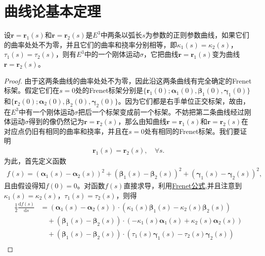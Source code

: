 \documentclass[../../main.tex]{subfiles}%
\begin{document}
\section{曲线论基本定理}

\begin{theorem}\label{theorem:两条曲率挠率相同的曲线只相差一个位置}
设$\bm{r} = \bm{r}_1(s)$和$\bm{r} = \bm{r}_2(s)$是$E^3$中两条以弧长$s$为参数的正则参数曲线，如果它们的曲率处处不为零，并且它们的曲率和挠率分别相等，即$\kappa_1(s) = \kappa_2(s)$，$\tau_1(s) = \tau_2(s)$，则有$E^3$中的一个刚体运动$\sigma$，它把曲线$\bm{r} = \bm{r}_1(s)$变为曲线$\bm{r} = \bm{r}_2(s)$。
\end{theorem}
\begin{proof}

由于这两条曲线的曲率处处不为零，因此沿这两条曲线有完全确定的Frenet标架。假定它们在$s=0$处的Frenet标架分别是$\{\bm{r}_1(0);\bm{\alpha}_1(0),\bm{\beta}_1(0),\bm{\gamma}_1(0)\}$和$\{\bm{r}_2(0);\bm{\alpha}_2(0),\bm{\beta}_2(0),\bm{\gamma}_2(0)\}$。因为它们都是右手单位正交标架，故由，在$E^3$中有一个刚体运动$\sigma$把后一个标架变成前一个标架。不妨把第二条曲线经过刚体运动$\sigma$得到的像仍然记为$\bm{r} = \bm{r}_2(s)$，那么由知曲线$\bm{r} = \bm{r}_1(s)$和$\bm{r} = \bm{r}_2(s)$在对应点仍旧有相同的曲率和挠率，并且在$s=0$处有相同的Frenet标架。我们要证明
\begin{align*}
\bm{r}_1(s) = \bm{r}_2(s),\quad \forall s.
\end{align*}
为此，首先定义函数
\begin{align}
f(s) = (\bm{\alpha}_1(s) - \bm{\alpha}_2(s))^2 + (\bm{\beta}_1(s) - \bm{\beta}_2(s))^2 + (\bm{\gamma}_1(s) - \bm{\gamma}_2(s))^2,
\label{eq:--3ur0jfdjgijiL:LIHFIOAWHFNASawf5.1}
\end{align}
且由假设得知$f(0) = 0$。对函数$f(s)$直接求导，利用\hyperref[theorem:微分几何-Frenet公式]{Frenet公式},并且注意到$\kappa_1(s) = \kappa_2(s)$，$\tau_1(s) = \tau_2(s)$，则得
\begin{align*}
\frac{1}{2}\frac{\mathrm{d}f(s)}{\mathrm{d}s} &= (\bm{\alpha}_1(s) - \bm{\alpha}_2(s)) \cdot (\kappa_1(s)\bm{\beta}_1(s) - \kappa_2(s)\bm{\beta}_2(s)) \\
&\quad + (\bm{\beta}_1(s) - \bm{\beta}_2(s)) \cdot (-\kappa_1(s)\bm{\alpha}_1(s) + \kappa_2(s)\bm{\alpha}_2(s)) \\
&\quad + (\bm{\beta}_1(s) - \bm{\beta}_2(s)) \cdot (\tau_1(s)\bm{\gamma}_1(s) - \tau_2(s)\bm{\gamma}_2(s)) \\

\end{align*}
\end{proof}
\end{document}
